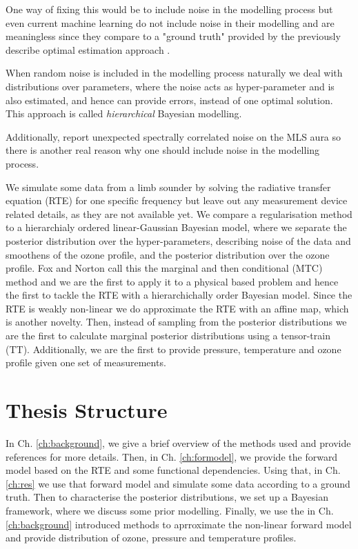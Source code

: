 One way of fixing this would be to include noise in the modelling process but even current machine learning do not include noise in their modelling and are meaningless since they compare to a "ground truth" provided by the previously describe optimal estimation approach \cite{werner2023machlearn, bojkov2008NeuralNet}.

When random noise is included in the modelling process naturally we deal with distributions over parameters, where the noise acts as hyper-parameter and is also estimated, and hence can provide errors, instead of one optimal solution.
This approach is called \textit{hierarchical} Bayesian modelling.

Additionally, \cite{livesey2006retrieval} report unexpected spectrally correlated noise on the MLS aura so there is another real reason why one should include noise in the modelling process.


We simulate some data from a limb sounder by solving the radiative transfer equation (RTE) for one specific frequency but leave out any measurement device related details, as they are not available yet.
We compare a regularisation method to a hierarchialy ordered linear-Gaussian Bayesian model, where we separate the posterior distribution over the hyper-parameters, describing noise of the data and smoothens of the ozone profile, and the posterior distribution over the ozone profile.
Fox and Norton call this the marginal and then conditional (MTC) method \cite{} and we are the first to apply it to a physical based problem and hence the first to tackle the RTE with a hierarchichally order Bayesian model.
Since the RTE is weakly non-linear we do approximate the RTE with an affine map, which is another novelty.
Then, instead of sampling from the posterior distributions we are the first to calculate marginal posterior distributions using a tensor-train (TT).
Additionally, we are the first to provide pressure, temperature and ozone profile given one set of measurements. \cite{}


\section{Thesis Structure}
In Ch. \ref{ch:background}, we give a brief overview of the methods used and provide references for more details.
Then, in Ch. \ref{ch:formodel}, we provide the forward model based on the RTE and some functional dependencies.
Using that, in Ch. \ref{ch:res} we use that forward model and simulate some data according to a ground truth.
Then to characterise the posterior distributions, we set up a Bayesian framework, where we discuss some prior modelling.
Finally, we use the in Ch. \ref{ch:background} introduced methods to aprroximate the non-linear forward model and provide distribution of ozone, pressure and temperature profiles.
